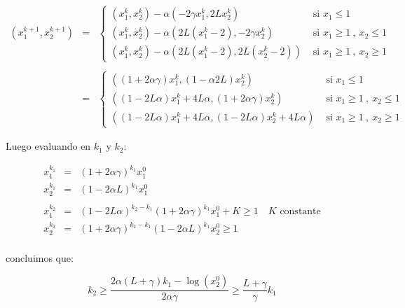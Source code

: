 \begin{remark}
	\begin{equation*}
	\begin{array}{rcl}
	\left(x_1^{k+1}, x^{k+1}_2\right) & = & \left\lbrace\begin{array}{cc}
	\left(x^k_1, x^k_2\right)- \alpha\left(-2 \gamma x^k_1, 2Lx^k_2\right) & \text{ si } x_1 \leq 1\\
	\left(x^k_1, x^k_2\right)- \alpha\left(2L \left(x_1^k -2\right), -2 \gamma x^k_2\right) & \text{ si } x_1 \geq 1 \ , \ x_2 \leq 1 \\
	\left(x^k_1, x^k_2\right)- \alpha\left(2L \left(x_1^k -2\right), 2L \left(x_2^k -2\right)\right) & \text{ si } x_1 \geq 1 \ , \ x_2 \geq 1
	\end{array}\right. \\
	&&\\
	& = &\left\lbrace\begin{array}{cc}
	\left(\left(1 + 2\alpha \gamma \right)x^k_1, \left(1 - \alpha 2L\right)x^k_2\right) & \text{ si } x_1 \leq 1\\
	\left(\left(1 - 2L \alpha \right)x^k_1 + 4L \alpha, \left(1 + 2 \alpha \gamma \right)x^k_2\right) & \text{ si } x_1 \geq 1 \ , \ x_2 \leq 1 \\
	\left(\left(1 - 2L \alpha \right)x^k_1 + 4L \alpha, \left(1 - 2L \alpha \right)x^k_2 + 4L \alpha\right)  & \text{ si } x_1 \geq 1 \ , \ x_2 \geq 1
	\end{array}\right.
	\end{array}
	\end{equation*}
	
	Luego evaluando en $k_1$ y $k_2$:
	
	\begin{equation*}
	\begin{array}{rcl}
	x^{k_1}_1 & = & \left(1 + 2 \alpha \gamma\right)^{k_1} x^0_1 \\
	x^{k_1}_2 & = & \left(1 - 2 \alpha L\right)^{k_1} x^0_1 \\
	&&\\
	x^{k_2}_1 & = & \left(1 - 2L\alpha\right)^{k_2 - k_1}\left(1 + 2 \alpha \gamma\right)^{k_1} x^0_1 + K\geq 1 \quad K \text{ constante}\\
	x^{k_2}_2 & = & \left(1 + 2 \alpha \gamma\right)^{k_2-k_1}\left(1 - 2 \alpha L\right)^{k_1} x^0_2\geq 1 \\
	\end{array}
	\end{equation*}
	
	concluimos que:
	
	\begin{equation}
		k_2 \geq \dfrac{2 \alpha \left(L + \gamma\right)k_1 - \log\left(x_2^0\right)}{2 \alpha \gamma} \geq \dfrac{L + \gamma}{\gamma} k_1 
	\end{equation}
	

\end{remark}
